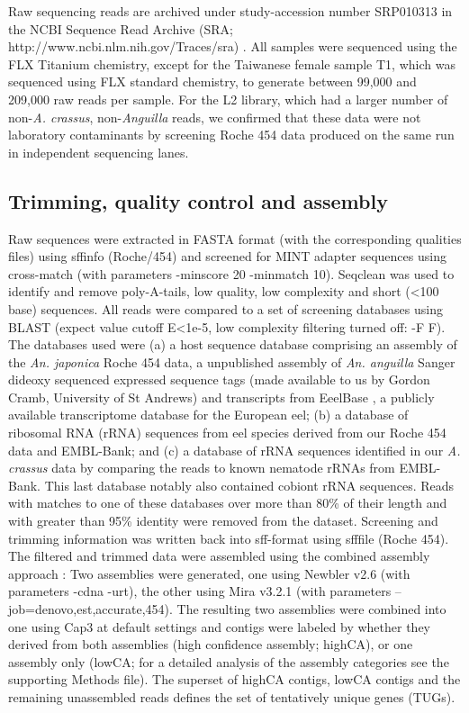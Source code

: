 \documentclass[10pt]{bmc_article}
\newenvironment{bmcformat}{\begin{raggedright}\baselineskip20pt\sloppy\setboolean{publ}{false}}{\end{raggedright}\baselineskip20pt\sloppy}
\begin{document}
\begin{bmcformat}
Raw sequencing reads are archived under study-accession number
SRP010313 in the NCBI Sequence Read Archive (SRA;
http://www.ncbi.nlm.nih.gov/Traces/sra) \cite{pmid22140104}. All
samples were sequenced using the FLX Titanium chemistry, except for
the Taiwanese female sample T1, which was sequenced using FLX standard
chemistry, to generate between 99,000 and 209,000 raw reads per
sample. For the L2 library, which had a larger number of
non-\textit{A. crassus}, non-\textit{Anguilla} reads, we confirmed
that these data were not laboratory contaminants by screening Roche
454 data produced on the same run in independent sequencing lanes.

\subsection*{Trimming, quality control and assembly}

Raw sequences were extracted in FASTA format (with the corresponding
qualities files) using sffinfo (Roche/454) and screened for MINT
adapter sequences using cross-match \cite{PHRAP} (with parameters
-minscore 20 -minmatch 10). Seqclean \cite{tgicl_pertea} was used to
identify and remove poly-A-tails, low quality, low complexity and
short (<100 base) sequences. All reads were compared to a set of
screening databases using BLAST \cite{pmid2231712} (expect value
cutoff E<1e-5, low complexity filtering turned off: -F F). The
databases used were (a) a host sequence database comprising an
assembly of the \textit{An. japonica} Roche 454 data, a unpublished
assembly of \textit{An. anguilla} Sanger dideoxy sequenced expressed
sequence tags (made available to us by Gordon Cramb, University of St
Andrews) and transcripts from EeelBase \cite{pmid21080939}, a publicly
available transcriptome database for the European eel; (b) a database
of ribosomal RNA (rRNA) sequences from eel species derived from our
Roche 454 data and EMBL-Bank; and (c) a database of rRNA sequences
identified in our \textit{A. crassus} data by comparing the reads to
known nematode rRNAs from EMBL-Bank. This last database notably also
contained cobiont rRNA sequences. Reads with matches to one of these
databases over more than 80\% of their length and with greater than
95\% identity were removed from the dataset. Screening and trimming
information was written back into sff-format using sfffile (Roche
454). The filtered and trimmed data were assembled using the combined
assembly approach \cite{pmid20950480}: Two assemblies were generated,
one using Newbler v2.6 \cite{pmid16056220} (with parameters -cdna
-urt), the other using Mira v3.2.1 \cite{miraEST} (with parameters
--job=denovo,est,accurate,454). The resulting two assemblies were
combined into one using Cap3 \cite{Cap3_Huang} at default settings and
contigs were labeled by whether they derived from both assemblies
(high confidence assembly; highCA), or one assembly only (lowCA; for a
detailed analysis of the assembly categories see the supporting
Methods file). The superset of highCA contigs, lowCA contigs and the
remaining unassembled reads defines the set of tentatively unique
genes (TUGs).


\end{bmcformat}
\end{document}
